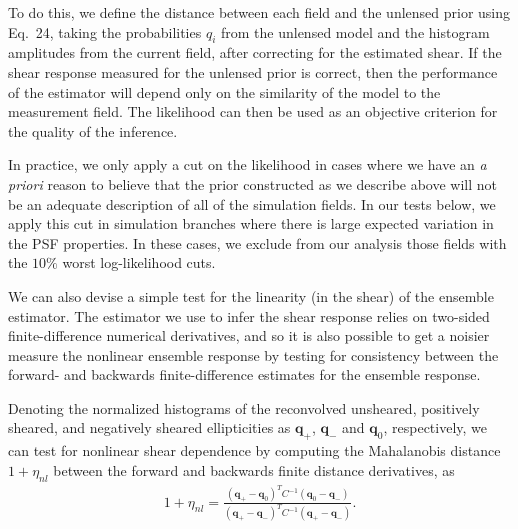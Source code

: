 \documentclass[iop]{emulateapj}
\newcommand\rmcomment[1]{\textcolor{red}{(RM: #1)}}
\begin{document}
To do this, we define the distance between each field and the unlensed
prior using Eq.~24, taking the probabilities $q_i$ from the unlensed
model and the histogram amplitudes from the current field, after
correcting for the estimated shear. If the shear response measured for
the unlensed prior is correct, then the performance of the estimator
will depend only on the similarity of the model to the measurement
field. The likelihood can then be used as an objective criterion for
the quality of the inference.

In practice, we only apply a cut on the likelihood in cases where we
have an {\it a priori} reason to believe that the prior constructed as
we describe above will not be an adequate description of all of the
simulation fields. In our tests below, we apply this cut in simulation
branches where there is large expected variation in the PSF
properties. In these cases, we exclude from our analysis those fields
with the $10\%$ worst log-likelihood cuts.



We can also devise a simple test for the linearity (in the shear) of
the ensemble estimator. The estimator we use to infer the shear
response relies on two-sided finite-difference numerical derivatives,
and so it is also possible to get a noisier measure the nonlinear
ensemble response by testing for consistency between the forward- and
backwards finite-difference estimates for the ensemble response. 

Denoting the normalized histograms of the reconvolved unsheared,
positively sheared, and negatively sheared ellipticities as
$\mathbf{q}_+$, $\mathbf{q}_-$ and $\mathbf{q}_0$, respectively, we
can test for nonlinear shear dependence by computing the Mahalanobis
distance $1+\eta_{nl}$ between the forward and backwards finite distance
derivatives, as
\begin{align}
1+\eta_{nl} = \frac{(\mathbf{q}_{+} - \mathbf{q}_{0})^T C^{-1} (\mathbf{q}_{0} - \mathbf{q}_{-})}{(\mathbf{q}_+ -
  \mathbf{q}_ -)^TC^{-1}(\mathbf{q}_+ - \mathbf{q}_-)}.
\end{align}
\end{document}
